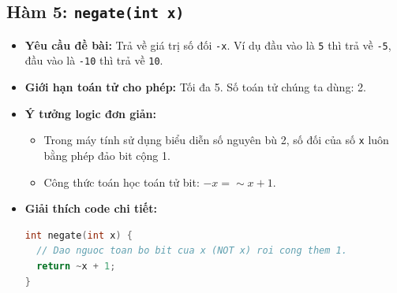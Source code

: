 \documentclass[12pt, a4paper]{article}
\begin{document}
\newpage

\subsection{Hàm 5: \texttt{negate(int x)}}
\begin{itemize}
    \item \textbf{Yêu cầu đề bài:} Trả về giá trị số đối \texttt{-x}. Ví dụ đầu vào là \texttt{5} thì trả về \texttt{-5}, đầu vào là \texttt{-10} thì trả về \texttt{10}.
    \item \textbf{Giới hạn toán tử cho phép:} Tối đa 5. Số toán tử chúng ta dùng: 2.
    \item \textbf{Ý tưởng logic đơn giản:}
    \begin{itemize}
        \item Trong máy tính sử dụng biểu diễn số nguyên bù 2, số đối của số \texttt{x} luôn bằng phép đảo bit cộng 1.
        \item Công thức toán học toán tử bit: $-x = \sim x + 1$.
    \end{itemize}
    \item \textbf{Giải thích code chi tiết:}


\begin{minipage}{\linewidth}
\begin{lstlisting}[language=C]
int negate(int x) {
  // Dao nguoc toan bo bit cua x (NOT x) roi cong them 1.
  return ~x + 1;
}
\end{lstlisting}
\end{minipage}
\end{itemize}

\newpage
\end{document}

